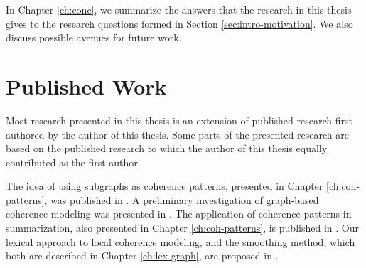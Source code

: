 In Chapter \ref{ch:conc}, we summarize the answers that the research in this thesis gives to the research questions formed in Section \ref{sec:intro-motivation}. 
We also discuss possible avenues for future work. 

\section{Published Work}
\label{sec:intro-published}

Most research presented in this thesis is an extension of published research first-authored by the author of this thesis. 
Some parts of the presented research are based on the published research to which the author of this thesis equally contributed as the first author. 

The idea of using subgraphs as coherence patterns, presented in Chapter \ref{ch:coh-patterns}, was published in . 
A preliminary investigation of graph-based coherence modeling was presented in . 
The application of coherence patterns in summarization, also presented in Chapter \ref{ch:coh-patterns}, is published in . 
Our lexical approach to local coherence modeling, and the smoothing method, which both are described in Chapter \ref{ch:lex-graph}, are proposed in .


